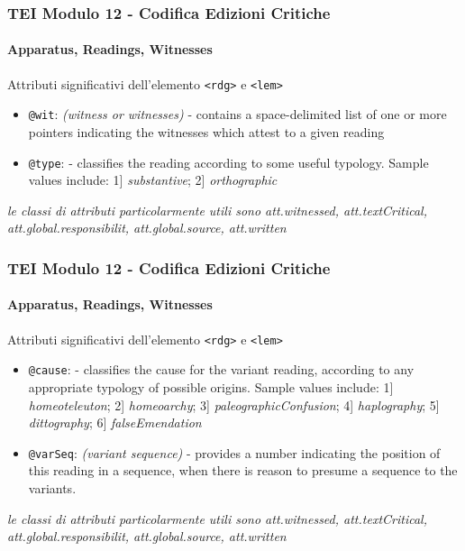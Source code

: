 



\begin{frame}
    \frametitle{TEI Modulo 12 - Codifica Edizioni Critiche}
    \framesubtitle{Apparatus, Readings, Witnesses}
    \addtocounter{nframe}{1}

    \begin{block}{Attributi significativi dell'elemento \texttt{<rdg>} e \texttt{<lem>}}
        \begin{itemize}
            \item \texttt{@wit}: \textit{(witness or witnesses)} - contains a space-delimited list of one or more pointers indicating the witnesses which attest to a given reading
            \item \texttt{@type}: \textit{} - classifies the reading according to some useful typology. Sample values include: 1] \textit{substantive}; 2] \textit{orthographic}
        \end{itemize}
    \end{block}

    \textit{le classi di attributi particolarmente utili sono att.witnessed, att.textCritical, att.global.responsibilit, att.global.source, att.written}

\end{frame}

\begin{frame}
    \frametitle{TEI Modulo 12 - Codifica Edizioni Critiche}
    \framesubtitle{Apparatus, Readings, Witnesses}
    \addtocounter{nframe}{1}

    \begin{block}{Attributi significativi dell'elemento \texttt{<rdg>} e \texttt{<lem>}}
        \begin{itemize}
            \item \texttt{@cause}: \textit{} - classifies the cause for the variant reading, according to any appropriate typology of possible origins. Sample values include: 1] \textit{homeoteleuton}; 2] \textit{homeoarchy}; 3] \textit{paleographicConfusion}; 4] \textit{haplography}; 5] \textit{dittography}; 6] \textit{falseEmendation}
            \item \texttt{@varSeq}: \textit{(variant sequence)} - provides a number indicating the position of this reading in a sequence, when there is reason to presume a sequence to the variants.
        \end{itemize}
    \end{block}

    \textit{le classi di attributi particolarmente utili sono att.witnessed, att.textCritical, att.global.responsibilit, att.global.source, att.written}
    
\end{frame}


